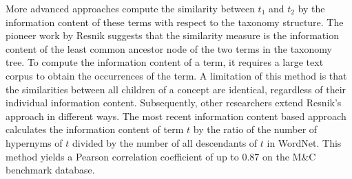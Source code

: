 More advanced approaches compute the similarity between $t_1$ and $t_2$ by
the information content of these terms with respect to the taxonomy structure.
The pioneer work by Resnik \cite{Resnik:1995} suggests that the similarity
measure is the information content of the least common ancestor node of the two
terms in the taxonomy tree.
To compute the information content of a term, it requires a large text corpus
to obtain the occurrences of the term.
A limitation of this method is that the similarities between all children of
a concept are identical, regardless of their individual information content.
Subsequently, other researchers extend Resnik's approach
\cite{Jiang:1997, Lin:1998, Seco:2004, Zhou:2008, Snchez:2011} in different ways.
The most recent information content based approach \cite{Snchez:2011} calculates
the information content of term $t$ by the ratio of
the number of hypernyms of $t$ divided by the number of all descendants of $t$ in WordNet.
This method yields a Pearson correlation coefficient of up to 0.87 on the M\&C benchmark
database.

